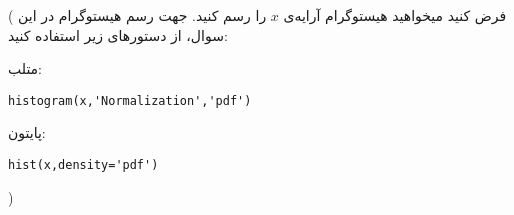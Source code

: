 \documentclass{article}
\begin{document}
(
فرض کنید میخواهید هیستوگرام آرایه‌ی $x$ را رسم کنید. جهت رسم هیستوگرام در این سوال، از دستورهای زیر استفاده کنید:

متلب:
\begin{latin}
\begin{verbatim}
histogram(x,'Normalization','pdf')
\end{verbatim}
\end{latin}
پایتون:
\begin{latin}
\begin{verbatim}
hist(x,density='pdf')
\end{verbatim}
\end{latin}

)
\end{document}
